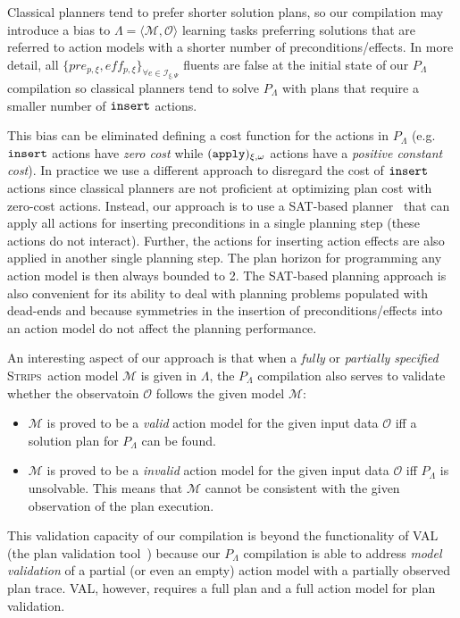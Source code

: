 \documentclass[runningheads]{llncs}
\newcommand{\tup}[1]{{\langle #1 \rangle}}
\newcommand{\strips}{\textsc{Strips}}     %
\begin{document}
Classical planners tend to prefer shorter solution plans, so our compilation may introduce a bias to $\Lambda=\tup{\mathcal{M},{\mathcal O}}$ learning tasks preferring solutions that are referred to action models with a shorter number of preconditions/effects. In more detail, all $\{pre_{p,\xi}, eff_{p,\xi}\}_{\forall e\in{\mathcal I}_{\xi,\Psi}}$ fluents are false at the initial state of our $P_{\Lambda}$ compilation so classical planners tend to solve $P_{\Lambda}$ with plans that require a smaller number of ${\tt{\small insert}}$ actions.

This bias can be eliminated defining a cost function for the actions in $P_{\Lambda}$ (e.g. ${\tt \small insert}$ actions have {\em zero cost} while ${\tt \small (apply)_{\xi,\omega}}$ actions have a {\em positive constant cost}). In practice we use a different approach to disregard the cost of ${\tt \small insert}$ actions since classical planners are not proficient at optimizing plan cost with zero-cost actions. Instead, our approach is to use a SAT-based planner~\cite{rintanen2014madagascar} that can apply all actions for inserting preconditions in a single planning step (these actions do not interact). Further, the actions for inserting action effects are also applied in another single planning step. The plan horizon for programming any action model is then always bounded to 2. The SAT-based planning approach is also convenient for its ability to deal with planning problems populated with dead-ends and because symmetries in the insertion of preconditions/effects into an action model do not affect the planning performance.

An interesting aspect of our approach is that when a {\em fully} or {\em partially specified} \strips\ action model $\mathcal{M}$ is given in $\Lambda$, the $P_{\Lambda}$ compilation also serves to validate whether the observatoin $\mathcal{O}$ follows the given model $\mathcal{M}$:
\begin{itemize}
	\item $\mathcal{M}$ is proved to be a {\em valid} action model for the given input data $\mathcal{O}$ iff a solution plan for $P_{\Lambda}$ can be found.
	\item $\mathcal{M}$ is proved to be a {\em invalid} action model for the given input data $\mathcal{O}$ iff $P_{\Lambda}$ is unsolvable. This means that $\mathcal{M}$ cannot be consistent with the given observation of the plan execution.
\end{itemize}
This validation capacity of our compilation is beyond the functionality of VAL (the plan validation tool~\cite{howey2004val}) because our $P_{\Lambda}$ compilation is able to address {\em model validation} of a partial (or even an empty) action model with a partially observed plan trace. VAL, however, requires a full plan and a full action model for plan validation.
\end{document}
